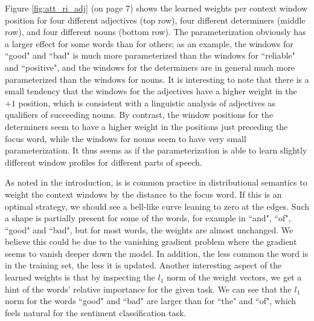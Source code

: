 \documentclass[11pt]{article}
\begin{document}

Figure \ref{fig:att_ri_adj} (on page 7) shows the learned weights per context window position for four different adjectives (top row), four different determiners (middle row), and four different nouns (bottom row). The parameterization obviously has a larger effect for some words than for others; as an example, the windows for ``good" and ``bad" is much more parameterized than the windows for ``reliable" and ``positive", and the windows for the determiners are in general much more parameterized than the windows for nouns. It is interesting to note that there is a small tendency that the windows for the adjectives have a higher weight in the $+1$ position, which is consistent with a linguistic analysis of adjectives as qualifiers of succeeding nouns. By contrast, the window positions for the determiners seem to have a higher weight in the positions just preceding the focus word, while the windows for nouns seem to have very small parameterization. It thus seems as if the parameterization is able to learn slightly different window profiles for different parts of speech.


As noted in the introduction, is is common practice in distributional semantics to weight the context windows by the distance to the focus word. If this is an optimal strategy, we should see a bell-like curve leaning to zero at the edges. Such a shape is partially present for some of the words, for example in ``and", ``of", ``good" and ``bad", but for most words, the weights are almost unchanged. We believe this could be due to the vanishing gradient problem where the gradient seems to vanish deeper down the model. In addition, the less common the word is in the training set, the less it is updated. Another interesting aspect of the learned weights is that by inspecting the $l_1$ norm of the weight vectors, we get a hint of the words' relative importance for the given task. We can see that the $l_1$ norm for the words ``good" and ``bad" are larger than for ``the" and ``of", which feels natural for the sentiment classification task.
\end{document}
